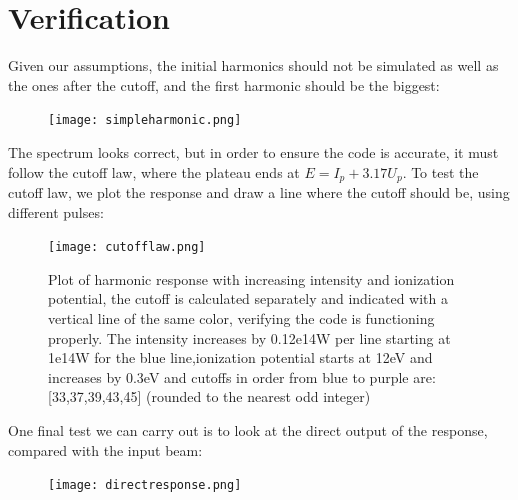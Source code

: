 \documentclass[11pt,a4paper]{report}
\begin{document}
\section{Verification}
Given our assumptions, the initial harmonics should not be simulated as well as the ones after the cutoff, and the first harmonic should be the biggest:
\begin{figure}[h]
\centering
\texttt{[image: simpleharmonic.png]}
\end{figure}
\newpage

\thispagestyle{fancy}
\renewcommand{\headrulewidth}{0pt}
\fancyhead{}
\setlength{\footskip}{0pt}
%

The spectrum looks correct, but in order to ensure the code is accurate, it must follow the cutoff law, where the plateau ends at $E = I_p + 3.17U_p$. To test the cutoff law, we plot the response and draw a line where the cutoff should be, using different pulses:
\begin{figure}[h]
\centering
\texttt{[image: cutofflaw.png]}
\caption{Plot of harmonic response with increasing intensity and ionization potential, the cutoff is calculated separately and indicated with a vertical line of the same color, verifying the code is functioning properly. The intensity increases by 0.12e14W per line starting at 1e14W for the blue line,ionization potential starts at 12eV and increases by 0.3eV and cutoffs in order from blue to purple are: [33,37,39,43,45] (rounded to the nearest odd integer) }
\end{figure}

One final test we can carry out is to look at the direct output of the response, compared with the input beam:
\begin{figure}[h]
\centering
\texttt{[image: directresponse.png]}
\end{figure}
\newpage
\end{document}

